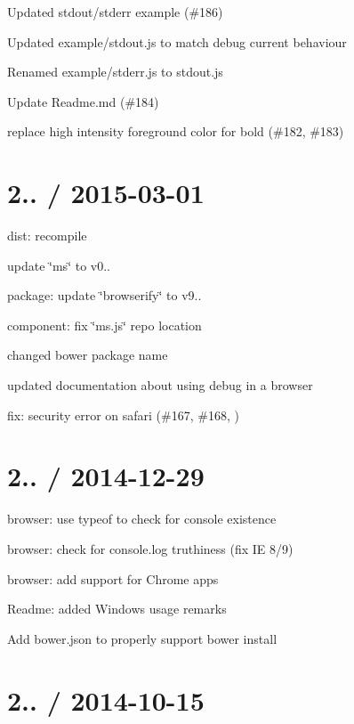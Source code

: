 
\begin{DoxyItemize}
\item Updated stdout/stderr example (\#186)
\item Updated example/stdout.\+js to match debug current behaviour
\item Renamed example/stderr.\+js to stdout.\+js
\item Update Readme.\+md (\#184)
\item replace high intensity foreground color for bold (\#182, \#183)
\end{DoxyItemize}

\section*{2.. / 2015-\/03-\/01 }


\begin{DoxyItemize}
\item dist\+: recompile
\item update \char`\"{}ms\char`\"{} to v0..
\item package\+: update \char`\"{}browserify\char`\"{} to v9..
\item component\+: fix \char`\"{}ms.\+js\char`\"{} repo location
\item changed bower package name
\item updated documentation about using debug in a browser
\item fix\+: security error on safari (\#167, \#168, )
\end{DoxyItemize}

\section*{2.. / 2014-\/12-\/29 }


\begin{DoxyItemize}
\item browser\+: use {\ttfamily typeof} to check for {\ttfamily console} existence
\item browser\+: check for {\ttfamily console.\+log} truthiness (fix I\+E 8/9)
\item browser\+: add support for Chrome apps
\item Readme\+: added Windows usage remarks
\item Add {\ttfamily bower.\+json} to properly support bower install
\end{DoxyItemize}

\section*{2.. / 2014-\/10-\/15 }


